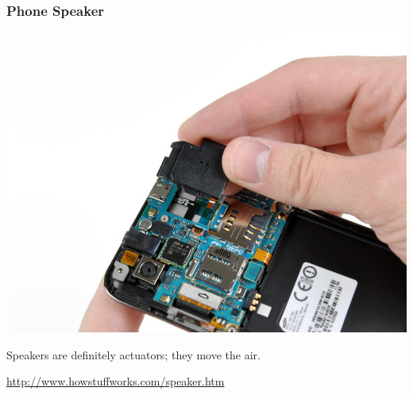 \begin{frame}
\frametitle{Phone Speaker}

\begin{center}
\includegraphics[width=.7\textwidth]{images/GalaxyS4G14-small.jpg}
\end{center}

\hspace*{3em}Speakers are definitely actuators; they move the air.
\begin{center}
\url{http://www.howstuffworks.com/speaker.htm}
\end{center}

\end{frame}

